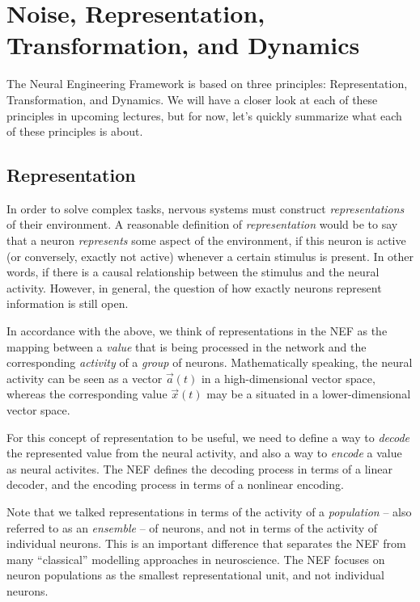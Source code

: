 \documentclass[10pt,letterpaper,oneside]{article}
\begin{document}
\section{Noise, Representation, Transformation, and Dynamics}

The Neural Engineering Framework is based on three principles: Representation, Transformation, and Dynamics. We will have a closer look at each of these principles in upcoming lectures, but for now, let's quickly summarize what each of these principles is about.

\subsection{Representation}

In order to solve complex tasks, nervous systems must construct \emph{representations} of their environment. A reasonable definition of \emph{representation} would be to say that a neuron \emph{represents} some aspect of the environment, if this neuron is active (or conversely, exactly not active) whenever a certain stimulus is present. In other words, if there is a causal relationship between the stimulus and the neural activity. However, in general, the question of how exactly neurons represent information is still open.

In accordance with the above, we think of representations in the NEF as the mapping between a \emph{value} that is being processed in the network and the corresponding \emph{activity} of a \emph{group} of neurons. Mathematically speaking, the neural activity can be seen as a vector $\vec a(t)$ in a high-dimensional vector space, whereas the corresponding value $\vec x(t)$ may be a situated in a lower-dimensional vector space.

For this concept of representation to be useful, we need to define a way to \emph{decode} the represented value from the neural activity, and also a way to \emph{encode} a value as neural activites. The NEF defines the decoding process in terms of a linear decoder, and the encoding process in terms of a nonlinear encoding.

Note that we talked representations in terms of the activity of a \emph{population} -- also referred to as an \emph{ensemble} -- of neurons, and not in terms of the activity of individual neurons. This is an important difference that separates the NEF from many \enquote{classical} modelling approaches in neuroscience. The NEF focuses on neuron populations as the smallest representational unit, and not individual neurons.
\end{document}
